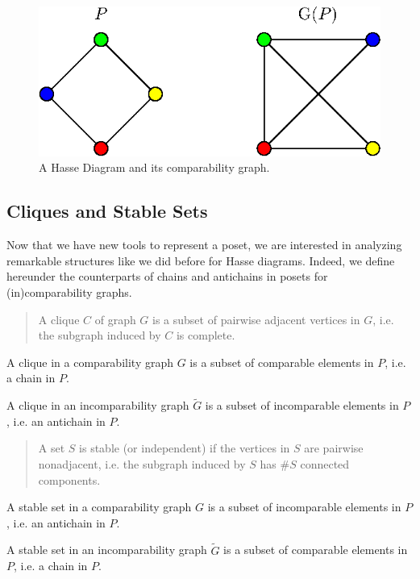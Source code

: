 \begin{figure}
	\centering
	\includegraphics[height=0.2\textheight]{fig/comp-graph}
	\caption{\label{fig:comp-graph} A Hasse Diagram and its comparability graph.}
\end{figure}




\subsection{Cliques and Stable Sets}


Now that we have new tools to represent a poset, we are interested in analyzing remarkable structures like we did before for Hasse diagrams. Indeed, we define hereunder the counterparts of chains and antichains in posets for (in)comparability graphs.

\begin{quotation}
	A clique $C$ of graph $G$ is a subset of pairwise adjacent vertices in $G$, i.e. the subgraph induced by $C$ is complete.
\end{quotation}

A clique in a comparability graph ${G}$ is a subset of comparable  elements in ${P}$, i.e. a chain in ${P}$.

A clique in an incomparability graph $\widetilde{G}$ is a subset of incomparable  elements in ${P}$, i.e. an antichain in ${P}$.

\begin{quotation}
	A set $S$ is stable (or independent) if the vertices in $S$ are pairwise nonadjacent, i.e. the subgraph induced by $S$ has $\#S$ connected components.
\end{quotation}

A stable set in a comparability graph ${G}$ is a subset of incomparable elements in ${P}$, i.e. an antichain in ${P}$.

A stable set in an incomparability graph $\widetilde{G}$ is a subset of comparable elements in ${P}$, i.e. a chain in ${P}$.


